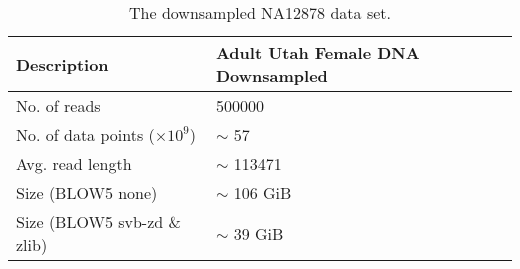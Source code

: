 \begin{table}
    \caption{\label{tab:data}The downsampled NA12878 data set.}
	\begin{tabular}{|l|m{4cm}|}
        \hline
        Description & Adult Utah Female DNA Downsampled\\
        \hline
	No. of reads & \num{500000}\\
	No. of data points ($\times 10^9$) & $\sim$ 57\\
	Avg. read length & $\sim$ \num{113471}\\
    Size (BLOW5 none) & $\sim$ 106 GiB\\
    Size (BLOW5 svb-zd \& zlib) & $\sim$ 39 GiB\\
	\hline
    \end{tabular}
\end{table}
